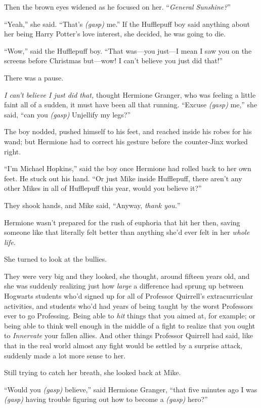 Then the brown eyes widened as he focused on her. “\emph{General Sunshine?}”

“Yeah,” she said. “That’s \emph{(gasp)} me.” If the Hufflepuff boy said anything about her being Harry Potter’s love interest, she decided, he was going to die.

“Wow,” said the Hufflepuff boy. “That was—you just—I mean I saw you on the screens before Christmas but—wow! I can’t believe you just did that!”

There was a pause.

\emph{I can’t believe I just did that,} thought Hermione Granger, who was feeling a little faint all of a sudden, it must have been all that running. “Excuse \emph{(gasp)} me,” she said, “can you \emph{(gasp)} Unjellify my legs?”

The boy nodded, pushed himself to his feet, and reached inside his robes for his wand; but Hermione had to correct his gesture before the counter-Jinx worked right.

“I’m Michael Hopkins,” said the boy once Hermione had rolled back to her own feet. He stuck out his hand. “Or just Mike inside Hufflepuff, there aren’t any other Mikes in all of Hufflepuff this year, would you believe it?”

They shook hands, and Mike said, “Anyway, \emph{thank you.}”

Hermione wasn’t prepared for the rush of euphoria that hit her then, saving someone like that literally felt better than anything she’d ever felt in her \emph{whole life.}

She turned to look at the bullies.

They were very big and they looked, she thought, around fifteen years old, and she was suddenly realizing just how \emph{large} a difference had sprung up between Hogwarts students who’d signed up for all of Professor Quirrell’s extracurricular activities, and students who’d had years of being taught by the worst Professors ever to go Professing. Being able to \emph{hit} things that you aimed at, for example; or being able to think well enough in the middle of a fight to realize that you ought to \emph{Innervate} your fallen allies. And other things Professor Quirrell had said, like that in the real world almost any fight would be settled by a surprise attack, suddenly made a lot more sense to her.

Still trying to catch her breath, she looked back at Mike.

“Would you \emph{(gasp)} believe,” said Hermione Granger, “that five minutes ago I was \emph{(gasp)} having trouble figuring out how to become a \emph{(gasp)} hero?”

